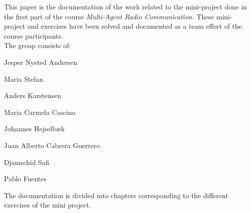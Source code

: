 This paper is the documentation of the work related to the mini-project done in the first part of the course \textit{Multi-Agent Radio Communication}. These mini-project and exercises have been solved and documented as a team effort of the course participants.\\

The group consists of:
	\begin{description}
	\item \hspace{4cm} Jesper Nysted Andersen
 	\item \hspace{4cm} Maria Stefan
 	\item \hspace{4cm} Anders Karstensen
 	\item \hspace{4cm} Maria Carmela Cascino
 	\item \hspace{4cm} Johannes Hejselbæk
 	\item \hspace{4cm} Juan Alberto Cabrera Guerrero
 	\item \hspace{4cm} Djamschid Safi
 	\item \hspace{4cm} Pablo Fuentes
	\end{description}

\vspace{2cm}
The documentation is divided into chapters corresponding to the different exercises of the mini project.